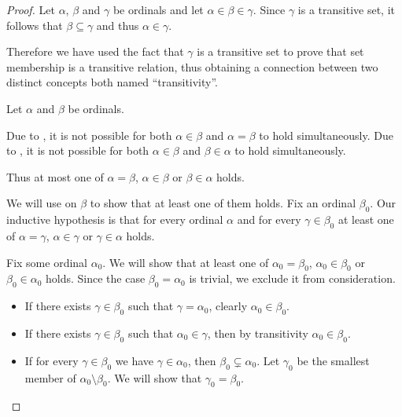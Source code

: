 \begin{proof}
   Let \( \alpha \), \( \beta \) and \( \gamma \) be ordinals and let \( \alpha \in \beta \in \gamma \). Since \( \gamma \) is a transitive set, it follows that \( \beta \subseteq \gamma \) and thus \( \alpha \in \gamma \).

  Therefore we have used the fact that \( \gamma \) is a transitive set to prove that set membership is a transitive relation, thus obtaining a connection between two distinct concepts both named \enquote{transitivity}.

   Let \( \alpha \) and \( \beta \) be ordinals.

  Due to , it is not possible for both \( \alpha \in \beta \) and \( \alpha = \beta \) to hold simultaneously. Due to , it is not possible for both \( \alpha \in \beta \) and \( \beta \in \alpha \) to hold simultaneously.

  Thus at most one of \( \alpha = \beta \), \( \alpha \in \beta \) or \( \beta \in \alpha \) holds.

  We will use  on \( \beta \) to show that at least one of them holds. Fix an ordinal \( \beta_0 \). Our inductive hypothesis is that for every ordinal \( \alpha \) and for every \( \gamma \in \beta_0 \) at least one of \( \alpha = \gamma \), \( \alpha \in \gamma \) or \( \gamma \in \alpha \) holds.

  Fix some ordinal \( \alpha_0 \). We will show that at least one of \( \alpha_0 = \beta_0 \), \( \alpha_0 \in \beta_0 \) or \( \beta_0 \in \alpha_0 \) holds. Since the case \( \beta_0 = \alpha_0 \) is trivial, we exclude it from consideration.

  \begin{itemize}
    \item If there exists \( \gamma \in \beta_0 \) such that \( \gamma = \alpha_0 \), clearly \( \alpha_0 \in \beta_0 \).
    \item If there exists \( \gamma \in \beta_0 \) such that \( \alpha_0 \in \gamma \), then by transitivity \( \alpha_0 \in \beta_0 \).
    \item If for every \( \gamma \in \beta_0 \) we have \( \gamma \in \alpha_0 \), then \( \beta_0 \subsetneq \alpha_0 \). Let \( \gamma_0 \) be the smallest member of \( \alpha_0 \setminus \beta_0 \). We will show that \( \gamma_0 = \beta_0 \).


\end{itemize}
\end{proof}
